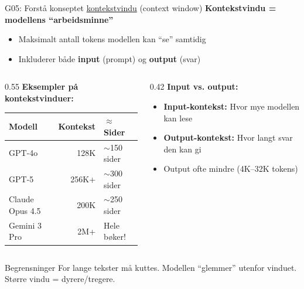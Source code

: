 \documentclass[aspectratio=169, 10pt]{beamer}
\begin{document}
\begin{frame}{G05: Forstå konseptet \href{https://en.wikipedia.org/wiki/Context_window}{kontekstvindu} (context window)}
    \textbf{Kontekstvindu = modellens ``arbeidsminne''}
    \begin{itemize}
        \item Maksimalt antall tokens modellen kan ``se'' samtidig
        \item Inkluderer både \textbf{input} (prompt) og \textbf{output} (svar)
    \end{itemize}

    \vspace{0.2cm}
    \begin{columns}[T]
        \begin{column}{0.55\textwidth}
            \textbf{Eksempler på kontekstvinduer:}
            \footnotesize
            \begin{tabular}{lrl}
                \toprule
                Modell & Kontekst & $\approx$ Sider \\
                \midrule
                GPT-4o & 128K & $\sim$150 sider \\
                GPT-5 & 256K+ & $\sim$300 sider \\
                Claude Opus 4.5 & 200K & $\sim$250 sider \\
                Gemini 3 Pro & 2M+ & Hele bøker! \\
                \bottomrule
            \end{tabular}
        \end{column}
        \begin{column}{0.42\textwidth}
            \textbf{Input vs. output:}
            \footnotesize
            \begin{itemize}
                \item \textbf{Input-kontekst:} Hvor mye modellen kan lese
                \item \textbf{Output-kontekst:} Hvor langt svar den kan gi
                \item Output ofte mindre (4K--32K tokens)
            \end{itemize}
        \end{column}
    \end{columns}

    \vspace{0.1cm}
    \begin{alertblock}{\footnotesize Begrensninger}
        \footnotesize
        For lange tekster må kuttes. Modellen ``glemmer'' utenfor vinduet. Større vindu = dyrere/tregere.
    \end{alertblock}
\end{frame}
\end{document}
